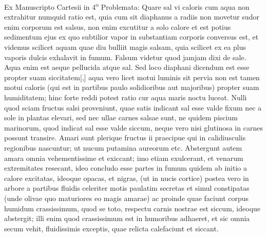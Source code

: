 %
\vspace*{8mm}%
\pstart
\noindent
[13~r\textsuperscript{o}]
\pend
\pstart%
\normalsize%
\noindent%
\centering%
Ex Manuscripto Cartesii\protect{} in 4\textsuperscript{o}
\pend%
\pstart%
\noindent
\centering
Problemata:
\pend%
\vspace*{0.5em}%
\pstart%
\pend%
\vspace*{0.5em}%
\footnotesize%
\pstart%
\noindent%
%
Quare sal vi caloris cum aqua non extrahitur numquid ratio est, quia cum sit diaphanus a radiis non movetur sudor enim corporum est salsus, non enim excutitur a solo calore et est potius sedimentum ejus ex quo subtilior vapor in substantiam corporis conversus est, et videmus scilicet aquam quae diu bulliit magis salsam, quia scilicet ex ea plus vaporis dulcis exhalavit in fumum.
\pend%
\count{}
\count{}
\count{}
\pstart%
Falsum videtur quod jamjam dixi de sale. Aqua enim est aeque pellucida atque sal. Sed loco diaphani dicendum est esse
propter suam siccitatem[,] aqua vero licet motui luminis sit pervia non est tamen motui caloris (qui est in partibus paulo solidioribus aut majoribus) propter suam humiditatem; hinc forte reddi potest ratio cur aqua maris noctu luceat.
\pend%
\pstart%
Nulli quod sciam fructus salsi proveniunt, quae satis indicant sal esse valde fixum nec a sole in plantas elevari, sed nec ullae carnes salsae sunt, ne quidem piscium marinorum, quod indicat sal esse valde siccum, neque vero nisi glutinosa in carnes possunt transire.
\pend
\newpage
\pstart%
Amari sunt plerique fructus ii praecipue qui in calidiusculis regionibus nascuntur; ut nucum putamina
aureorum etc. Abstergunt autem amara omnia vehementissime et exiccant; imo etiam exulcerant, et venarum extremitates resecant, ideo concludo esse partes in fumum quidem ab initio a calore excitatas, ideoque opacas, et nigras, (ut in nucis cortice) postea vero in arbore a partibus fluidis celeriter motis paulatim secretas et simul constipatas (unde olivae quo maturiores eo magis amarae) ac proinde quae faciunt corpus humidum crassissimum, quod se toto, respectu carnis nostrae est siccum, ideoque abstergit; illi enim quod crassissimum est in humoribus adhaeret, et sic omnia secum vehit, fluidissimis exceptis, quae relicta calefaciunt et siccant.
